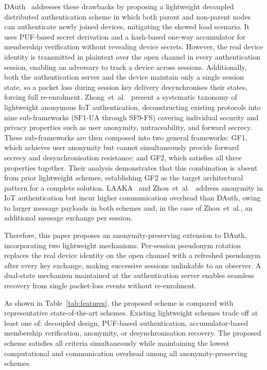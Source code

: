 \documentclass[conference]{IEEEtran}
\begin{document}
DAuth~\cite{das2026comsnets} addresses these drawbacks by proposing a
lightweight decoupled distributed authentication scheme in which both parent
and non-parent nodes can authenticate newly joined devices, mitigating the
skewed load scenario.  It uses PUF-based secret derivation and a hash-based
one-way accumulator for membership verification without revealing device
secrets.  However, the real device identity is transmitted in plaintext over
the open channel in every authentication session, enabling an adversary to
track a device across sessions.  Additionally, both the authentication server
and the device maintain only a single session state, so a packet loss during
session key delivery desynchronises their states, forcing full re-enrolment.
Zhong~et~al.~\cite{zhong2025survey} present a systematic taxonomy of
lightweight anonymous IoT authentication, deconstructing existing protocols
into nine sub-frameworks (SF1-UA through SF9-FS) covering individual security
and privacy properties such as user anonymity, untraceability, and forward
secrecy.  These sub-frameworks are then composed into two general frameworks:
GF1, which achieves user anonymity but cannot simultaneously provide forward
secrecy and desynchronisation resistance; and GF2, which satisfies all three
properties together.  Their analysis demonstrates that this combination is
absent from prior lightweight schemes, establishing GF2 as the target
architectural pattern for a complete solution.
LAAKA~\cite{ali2024laaka} and Zhou~et~al.~\cite{zhou2024auth} address
anonymity in IoT authentication but incur higher communication overhead than
DAuth, owing to larger message payloads in both schemes and, in the case of
Zhou~et~al., an additional message exchange per session.

Therefore, this paper proposes an anonymity-preserving extension to DAuth,
incorporating two lightweight mechanisms.  Per-session pseudonym rotation
replaces the real device identity on the open channel with a refreshed
pseudonym after every key exchange, making successive sessions unlinkable to
an observer.  A dual-state mechanism maintained at the authentication
server enables seamless recovery from single packet-loss events
without re-enrolment.

As shown in Table~\ref{tab:features}, the proposed scheme is compared with
representative state-of-the-art schemes.  Existing lightweight schemes trade
off at least one of: decoupled design, PUF-based authentication,
accumulator-based membership verification, anonymity, or desynchronisation
recovery.  The proposed scheme satisfies all criteria simultaneously while
maintaining the lowest computational and communication overhead among all
anonymity-preserving schemes.
\end{document}
